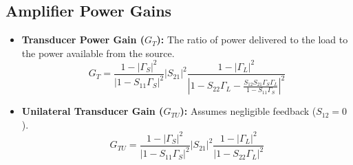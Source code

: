 \documentclass[12pt,a4paper]{article}
\begin{document}
\subsection{Amplifier Power Gains}
\begin{itemize}[leftmargin=*, itemsep=3pt]
  \item \textbf{Transducer Power Gain ($G_T$):} The ratio of power delivered to the load to the power available from the source.
    \begin{equation}
      G_T = \frac{1 - |\Gamma_S|^2}{|1 - S_{11}\Gamma_S|^2} |S_{21}|^2 \frac{1 - |\Gamma_L|^2}{|1 - S_{22}\Gamma_L - \frac{S_{12}S_{21}\Gamma_S\Gamma_L}{1 - S_{11}\Gamma_S}|^2}
    \end{equation}
  \item \textbf{Unilateral Transducer Gain ($G_{TU}$):} Assumes negligible feedback ($S_{12} = 0$).
    \begin{equation}
      G_{TU} = \frac{1 - |\Gamma_S|^2}{|1 - S_{11}\Gamma_S|^2} |S_{21}|^2 \frac{1 - |\Gamma_L|^2}{|1 - S_{22}\Gamma_L|^2}
    \end{equation}
\end{itemize}
\end{document}
